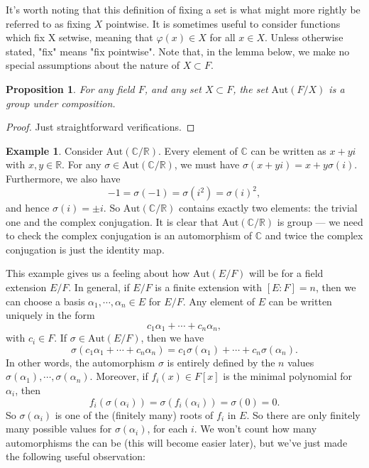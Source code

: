 \documentclass[12pt]{report}
\newtheorem{proposition}[theorem]{Proposition}
{\theoremstyle{remark}\newtheorem*{remark}{Remark}}
\theoremstyle{definition}
\newtheorem{example}[theorem]{Example}
\newcommand{\Aut}{\text{Aut}}
\newcommand{\CC}{\mathbb{C}}
\newcommand{\RR}{\mathbb{R}}
\begin{document}
It's worth noting that this definition of fixing a set is what might more
rightly be referred to as fixing $X$ pointwise. It is sometimes useful to consider functions which fix X setwise, meaning that $\varphi(x) \in X$ for all $x \in X$. Unless otherwise stated, "fix" means "fix pointwise".
Note that, in the lemma below, we make no special assumptions about
the nature of $X \subset F$.

\begin{proposition}
	For any field $F$, and any set $X \subset F$, the set $\Aut(F/X)$ is a group under composition.
\end{proposition}

\begin{proof}
	Just straightforward verifications.
\end{proof}

\begin{example}
	Consider $\Aut(\CC/\RR)$. Every element of $\CC$ can be written as $x+yi$ with $x,y\in\RR$. For any $\sigma\in \Aut(\CC/\RR)$, we must have $\sigma(x+yi)=x+y\sigma(i)$. Furthermore, we also have $$-1=\sigma(-1)=\sigma(i^2)=\sigma(i)^2,$$ and hence $\sigma(i)=\pm i$. So $\Aut(\CC/\RR)$ contains exactly two elements: the trivial one and the complex conjugation. It is clear that $\Aut(\CC/\RR)$ is group --- we need to check the complex conjugation is an automorphism of $\CC$ and twice the complex conjugation is just the identity map.
\end{example}

This example gives us a feeling about how $\Aut(E/F)$ will be for a field extension $E/F$. In general, if $E/F$ is a finite extension with $[E:F] = n$, then we can choose a basis $\alpha_1,\cdots,\alpha_n\in E$ for $E/F$. Any element of $E$ can be written uniquely in the form $$c_1\alpha_1+\cdots+c_n\alpha_n,$$ with $c_i\in F$. If $\sigma\in\Aut(E/F)$, then we have $$\sigma(c_1\alpha_1+\cdots+c_n\alpha_n)=c_1\sigma(\alpha_1)+\cdots+c_n\sigma(\alpha_n).$$  In other words, the automorphism $\sigma$ is entirely defined by the $n$ values $\sigma(\alpha_1),\cdots,\sigma(\alpha_n)$. Moreover, if $f_i(x) \in F[x]$ is the minimal polynomial for $\alpha_i$, then $$f_i(\sigma(\alpha_i)) = \sigma(f_i(\alpha_i)) = \sigma(0) = 0.$$
So $\sigma(\alpha_i)$ is one of the (finitely many) roots of $f_i$ in $E$. So there are only finitely many possible values for $\sigma(\alpha_i)$, for each $i$. We won't count how many automorphisms the can be (this will become easier later), but we've just made the following useful observation:
\end{document}
